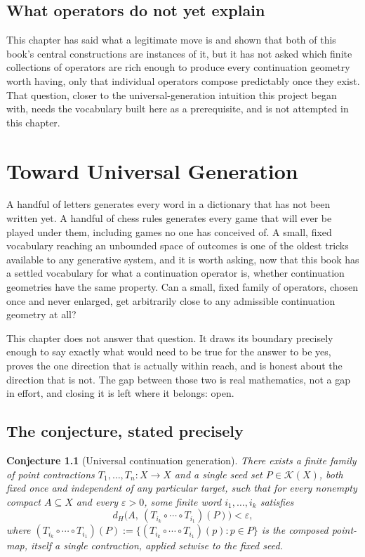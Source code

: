 \documentclass[11pt]{report}
\newtheorem{conjecture}{Conjecture}[chapter]
\begin{document}
\section*{What operators do not yet explain}

This chapter has said what a legitimate move is and shown that both
of this book's central constructions are instances of it, but it has
not asked which finite collections of operators are rich enough to
produce every continuation geometry worth having, only that individual
operators compose predictably once they exist. That question, closer
to the universal-generation intuition this project began with, needs
the vocabulary built here as a prerequisite, and is not attempted in
this chapter.

\chapter{Toward Universal Generation}

A handful of letters generates every word in a dictionary that has
not been written yet. A handful of chess rules generates every game
that will ever be played under them, including games no one has
conceived of. A small, fixed vocabulary reaching an unbounded space
of outcomes is one of the oldest tricks available to any generative
system, and it is worth asking, now that this book has a settled
vocabulary for what a continuation operator is, whether continuation
geometries have the same property. Can a small, fixed family of
operators, chosen once and never enlarged, get arbitrarily close to
any admissible continuation geometry at all?

This chapter does not answer that question. It draws its boundary
precisely enough to say exactly what would need to be true for the
answer to be yes, proves the one direction that is actually within
reach, and is honest about the direction that is not. The gap between
those two is real mathematics, not a gap in effort, and closing it is
left where it belongs: open.

\section*{The conjecture, stated precisely}

\begin{conjecture}[Universal continuation generation]
\label{conj:universal}
There exists a finite family of point contractions $T_1, \dots, T_n :
X \to X$ and a single seed set $P \in \mathcal{K}(X)$, both fixed once
and independent of any particular target, such that for every
nonempty compact $A \subseteq X$ and every $\varepsilon > 0$, some
finite word $i_1, \dots, i_k$ satisfies
\[
d_H\big(A,\ (T_{i_k} \circ \cdots \circ T_{i_1})(P)\big) < \varepsilon,
\]
where $(T_{i_k} \circ \cdots \circ T_{i_1})(P) := \{(T_{i_k} \circ
\cdots \circ T_{i_1})(p) : p \in P\}$ is the composed point-map,
itself a single contraction, applied setwise to the fixed seed.
\end{conjecture}
\end{document}
